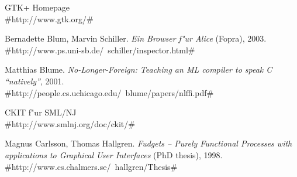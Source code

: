 \documentclass[a4paper,titlepage]{article}
\begin{document}
\begin{thebibliography}{99}
  GTK+ Homepage\\
                     #http://www.gtk.org/#

  Bernadette Blum, Marvin Schiller.
                     \emph{Ein Browser f"ur Alice} (Fopra), 2003.\\
                     #http://www.ps.uni-sb.de/~schiller/inspector.html#

  Matthias Blume. \emph{No-Longer-Foreign: Teaching an
                 ML compiler to speak C ``natively''}, 2001.\\
                 #http://people.cs.uchicago.edu/~blume/papers/nlffi.pdf#

  CKIT f"ur SML/NJ\\
                #http://www.smlnj.org/doc/ckit/#
                 
  Magnus Carlsson, Thomas Hallgren.
                   \emph{Fudgets -- Purely Functional Processes with
                   applications to Graphical User Interfaces} (PhD thesis), 
                   1998.\\
                   #http://www.cs.chalmers.se/~hallgren/Thesis#
\end{thebibliography}
\end{document}
